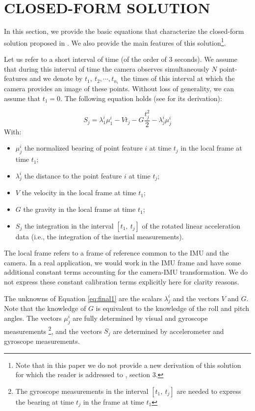 \documentclass[letterpaper, 10 pt, conference]{ieeeconf}  %
\begin{document}
\section{CLOSED-FORM SOLUTION}\label{SectionCFS}

In this section, we provide the basic equations that characterize the closed-form solution proposed in  \cite{Martinelli2014}. We also provide the main features of this solution\footnote{Note that in this paper we do not provide a new derivation of this solution for which the reader is addressed to \cite{Martinelli2014}, section 3.}.

Let us refer to a short interval of time (of the order of $3$ seconds). We assume that during this interval of time the camera observes simultaneously $N$ point-features and we denote by $t_1,~t_2,\cdots,t_{n_i}$ the times of this interval at which the camera provides an image of these points. Without loss of generality, we can assume that $t_1=0$.
The following equation holds (see \cite{Martinelli2014} for its derivation):


\begin{equation} \label{eq:final1}
S_j = \lambda_1^i\mu_1^i - V t_j - G \frac{t_j^2}{2} - \lambda^i_j \mu^i_j
\end{equation}
With:
\begin{itemize}
\item $\mu_j^i$ the normalized bearing of point feature $i$ at time $t_j$ in the local frame at time $t_1$;
\item $\lambda_j^i$ the distance to the point feature $i$ at time $t_j$;
\item $V$ the velocity in the local frame at time $t_1$;
\item $G$ the gravity in the local frame  at time $t_1$;
\item $S_j$ the integration in the interval $[t_1, ~t_j]$ of the rotated linear acceleration data (i.e., the integration of the inertial measurements).
\end{itemize}


The local frame refers to a frame of reference common to the IMU and the camera.
In a real application, we would work in the IMU frame and have some additional constant terms
accounting for the camera-IMU transformation.
We do not express these constant calibration terms explicitly here for clarity reasons.

The unknowns of Equation \ref{eq:final1} are the scalars $\lambda_j^i$ and the vectors $V$ and $G$.
Note that the knowledge of $G$ is equivalent to the knowledge of the roll and pitch angles.
The vectors $\mu_j^i$ are fully determined by visual and gyroscope measurements \footnote{The gyroscope measurements in the interval $[t_1, ~t_j]$ are needed to express the bearing at time $t_j$ in the frame at time $t_1$},
and the vectors $S_j$ are determined by accelerometer and gyroscope measurements.
\end{document}
